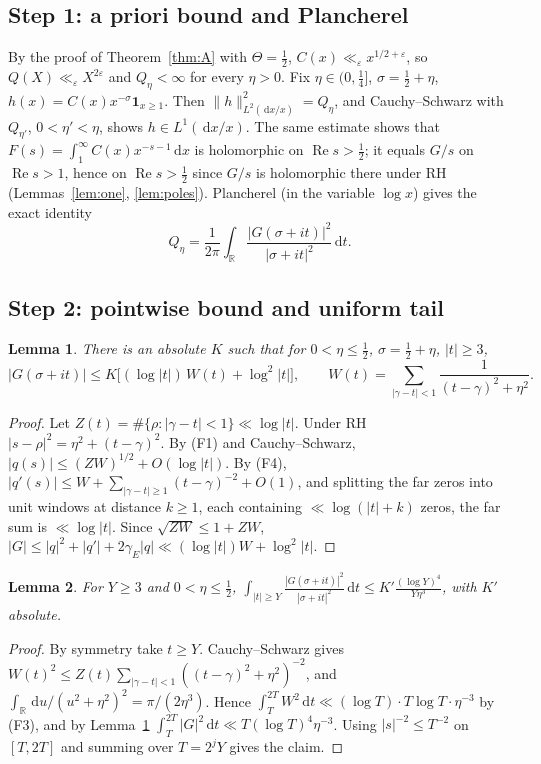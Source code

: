 \documentclass[11pt]{amsart}
\newtheorem{lemma}{Lemma}[section]
\theoremstyle{remark}
\theoremstyle{definition}
\newcommand{\gE}{\gamma_E}
\newcommand{\dd}{\,\mathrm{d}}
\renewcommand{\Re}{\operatorname{Re}}
\begin{document}
\subsection*{Step 1: a priori bound and Plancherel} By the proof of Theorem~\ref{thm:A} with $\Theta=\frac12$, $C(x)\ll_\varepsilon x^{1/2+\varepsilon}$, so $Q(X)\ll_\varepsilon X^{2\varepsilon}$ and $Q_\eta<\infty$ for every $\eta>0$. Fix $\eta\in(0,\frac14]$, $\sigma=\frac12+\eta$, $h(x)=C(x)x^{-\sigma}\mathbf 1_{x\ge1}$. Then $\|h\|^2_{L^2(\dd x/x)}=Q_\eta$, and Cauchy--Schwarz with $Q_{\eta'}$, $0<\eta'<\eta$, shows $h\in L^1(\dd x/x)$. The same estimate shows that $F(s)=\int_1^\infty C(x)x^{-s-1}\dd x$ is holomorphic on $\Re s>\frac12$; it equals $G/s$ on $\Re s>1$, hence on $\Re s>\frac12$ since $G/s$ is holomorphic there under RH (Lemmas~\ref{lem:one}, \ref{lem:poles}). Plancherel (in the variable $\log x$) gives the exact identity
\begin{equation}\label{eq:planch}
Q_\eta=\frac1{2\pi}\int_{\mathbb R}\frac{|G(\sigma+it)|^2}{|\sigma+it|^2}\dd t .
\end{equation}

\subsection*{Step 2: pointwise bound and uniform tail}
\begin{lemma}\label{lem:P}
There is an absolute $K$ such that for $0<\eta\le\frac12$, $\sigma=\frac12+\eta$, $|t|\ge3$,
\[
|G(\sigma+it)|\le K\big[(\log|t|)\,W(t)+\log^2|t|\big],\qquad W(t)=\sum_{|\gamma-t|<1}\frac1{(t-\gamma)^2+\eta^2}.
\]
\end{lemma}
\begin{proof}
Let $Z(t)=\#\{\rho:|\gamma-t|<1\}\ll\log|t|$. Under RH $|s-\rho|^2=\eta^2+(t-\gamma)^2$. By (F1) and Cauchy--Schwarz, $|q(s)|\le(ZW)^{1/2}+O(\log|t|)$. By (F4), $|q'(s)|\le W+\sum_{|\gamma-t|\ge1}(t-\gamma)^{-2}+O(1)$, and splitting the far zeros into unit windows at distance $k\ge1$, each containing $\ll\log(|t|+k)$ zeros, the far sum is $\ll\log|t|$. Since $\sqrt{ZW}\le1+ZW$, $|G|\le|q|^2+|q'|+2\gE|q|\ll(\log|t|)W+\log^2|t|$.
\end{proof}

\begin{lemma}\label{lem:T}
For $Y\ge3$ and $0<\eta\le\frac12$, $\displaystyle\int_{|t|\ge Y}\frac{|G(\sigma+it)|^2}{|\sigma+it|^2}\dd t\le K'\frac{(\log Y)^4}{Y\eta^3}$, with $K'$ absolute.
\end{lemma}
\begin{proof}
By symmetry take $t\ge Y$. Cauchy--Schwarz gives $W(t)^2\le Z(t)\sum_{|\gamma-t|<1}((t-\gamma)^2+\eta^2)^{-2}$, and $\int_{\mathbb R}\dd u/(u^2+\eta^2)^2=\pi/(2\eta^3)$. Hence $\int_T^{2T}W^2\dd t\ll(\log T)\cdot T\log T\cdot\eta^{-3}$ by (F3), and by Lemma~\ref{lem:P} $\int_T^{2T}|G|^2\dd t\ll T(\log T)^4\eta^{-3}$. Using $|s|^{-2}\le T^{-2}$ on $[T,2T]$ and summing over $T=2^jY$ gives the claim.
\end{proof}
\end{document}

